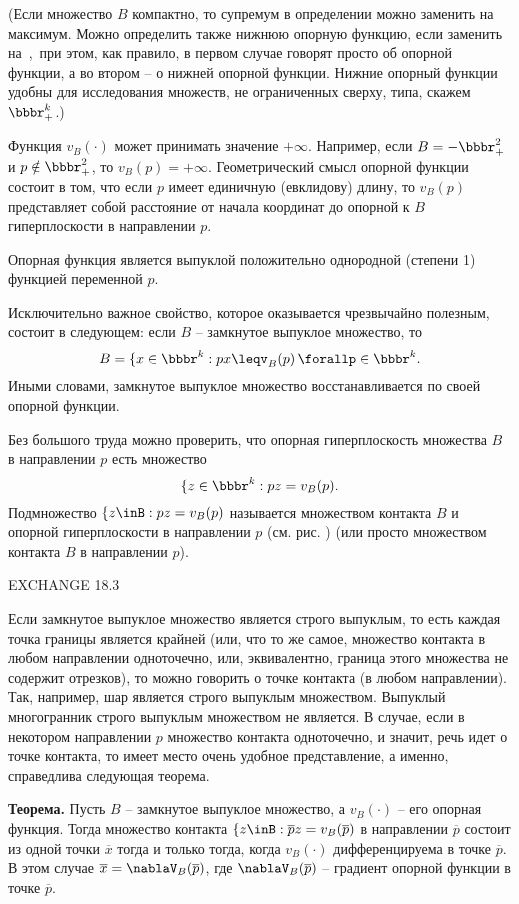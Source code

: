 (Если множество $B$ компактно, то супремум в определении можно заменить на
максимум. Можно определить также нижнюю опорную функцию, если заменить\, \sup\,
на\, \inf,\, при этом, как правило, в первом случае говорят просто об опорной функции, а
во втором -- о нижней опорной функции. Нижние опорный функции удобны для
исследования множеств, не ограниченных сверху, типа, скажем $\bbbr^k_+$.)

Функция $v_B(\cdot)$ может принимать значение $+\infty$. Например, если $B=-\bbbr^2_+$ и
$p\notin\bbbr^2_+$, то $v_B(p)=+\infty$. Геометрический смысл опорной функции
состоит в том, что если $p$ имеет единичную (евклидову) длину, то
$v_B(p)$ представляет собой расстояние от начала координат до опорной к
$B$ гиперплоскости в направлении $p$.

Опорная функция является выпуклой положительно однородной (степени 1) функцией переменной $p$.

Исключительно важное свойство, которое оказывается чрезвычайно полезным, состоит в следующем:
если $B$ -- замкнутое выпуклое множество, то
$$B=\{x\in\bbbr^k: px\leqv_B(p)\, \forallp\in\bbbr^k.$$
Иными словами, замкнутое выпуклое множество восстанавливается по своей опорной функции.

Без большого труда можно проверить, что опорная гиперплоскость множества $B$ в направлении
$p$ есть множество
$$\{z\in\bbbr^k: pz=v_B(p).$$
Подмножество $\{z\inB: pz=v_B(p)$ называется множеством контакта $B$ и опорной гиперплоскости
в направлении $p$ (см. рис.   ) (или просто множеством контакта $B$ в направлении $p$).

EXCHANGE 18.3

Если замкнутое выпуклое множество является строго выпуклым, то есть каждая точка границы является
крайней (или, что то же самое, множество контакта в любом направлении одноточечно, или, эквивалентно,
граница этого множества не содержит отрезков), то можно говорить о точке контакта (в любом направлении).
Так, например, шар является строго выпуклым множеством. Выпуклый многогранник строго выпуклым
множеством не является. В случае, если в некотором направлении $p$ множество контакта одноточечно,
и значит, речь идет о точке контакта, то имеет место очень удобное представление, а именно, справедлива
следующая теорема.

\textbf{Теорема.} Пусть $B$ -- замкнутое выпуклое множество, а $v_B(\cdot)$ -- его
опорная функция. Тогда множество контакта $\{z\inB: \overline{p}z=v_B(\overline{p})$
в направлении $\overline{p}$ состоит из одной точки $\overline{x}$ тогда и только тогда,
когда $v_B(\cdot)$ дифференцируема в точке $\overline{p}$. В этом случае
$\overline{x}=\nablaV_B(\overline{p})$, где $\nablaV_B(\overline{p})$ -- градиент
опорной функции в точке $\overline{p}$.

